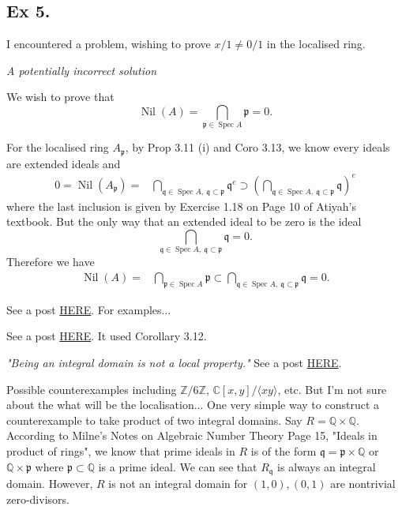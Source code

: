 \subsection{Ex 5.}

I encountered a problem, wishing to prove $x/1\neq 0/1$ in the localised ring.


\textit{A potentially incorrect solution}

We wish to prove that 
$$\operatorname{Nil}(A)=\bigcap_{\mathfrak p\in\operatorname{Spec}A}\mathfrak p=0.$$

For the localised ring $A_{\mathfrak p}$, by Prop 3.11 (i) and Coro 3.13, we know every ideals are extended ideals and 
\begin{align*}
	0=\operatorname{Nil}(A_{\mathfrak p}) =& \bigcap_{\mathfrak q\in\operatorname{Spec}A,~ \mathfrak q\subset \mathfrak p} \mathfrak q^{e}\supset \left(\bigcap_{\mathfrak q\in\operatorname{Spec}A,~ \mathfrak q\subset \mathfrak p} \mathfrak q\right)^e
\end{align*}where the last inclusion is given by Exercise 1.18 on Page 10 of Atiyah's textbook. But the only way that an extended ideal to be zero is the ideal 
$$\bigcap_{\mathfrak q\in\operatorname{Spec}A,~ \mathfrak q\subset \mathfrak p} \mathfrak q=0.$$ Therefore we have 
\begin{align*}
	\operatorname{Nil}(A) =& \bigcap_{\mathfrak p\in\operatorname{Spec}A}\mathfrak p\subset \bigcap_{\mathfrak q\in\operatorname{Spec}A,~ \mathfrak q\subset \mathfrak p} \mathfrak q=0.
\end{align*}

See a post \href{https://math.stackexchange.com/questions/2095939/proof-check-being-reduced-is-a-local-property-atiyah-macdonald-3-5?rq=1}{HERE}. For examples...

See a post \href{https://math.stackexchange.com/questions/2095939/proof-check-being-reduced-is-a-local-property-atiyah-macdonald-3-5?rq=1}{HERE}. It used Corollary 3.12.

\textit{"Being an integral domain is not a local property."} See a post \href{https://math.stackexchange.com/questions/685844/is-being-an-integral-domain-a-local-property}{HERE}.

Possible counterexamples including $\mathbb Z/6\mathbb Z$, $\mathbb C[x,y]/\langle xy\rangle$, etc. 
But I'm not sure about the what will be the localisation... 
One very simple way to construct a counterexample to take product of two integral domains. 
Say $R=\mathbb Q\times\mathbb Q$. According to Milne's Notes on Algebraic Number Theory Page 15, "Ideals in product of rings", we know that prime ideals in $R$ is of the form $\mathfrak q=\mathfrak p\times \mathbb Q$ or $\mathbb Q\times\mathfrak p$ where $\mathfrak p\subset\mathbb Q$ is a prime ideal. We can see that $R_{\mathfrak q}$ is always an integral domain. However, $R$ is not an integral domain for $(1,0),(0,1)$ are nontrivial zero-divisors.

